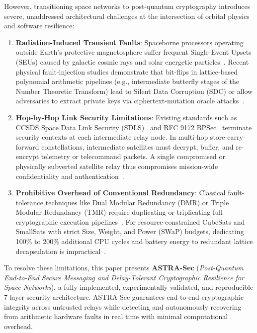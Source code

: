 \documentclass[conference,10pt]{IEEEtran}
\begin{document}
However, transitioning space networks to post-quantum cryptography introduces severe, unaddressed architectural challenges at the intersection of orbital physics and software resilience:
\begin{enumerate}
    \item \textbf{Radiation-Induced Transient Faults}: Spaceborne processors operating outside Earth's protective magnetosphere suffer frequent Single-Event Upsets (SEUs) caused by galactic cosmic rays and solar energetic particles~\cite{Dodd2003SEU,ECSS_Q_ST_60_15C}. Recent physical fault-injection studies demonstrate that bit-flips in lattice-based polynomial arithmetic pipelines (e.g., intermediate butterfly stages of the Number Theoretic Transform) lead to Silent Data Corruption (SDC) or allow adversaries to extract private keys via ciphertext-mutation oracle attacks~\cite{Ravi2023Twiddle,Delvaux2022Roulette,Hermelink2021Kyber}.
    \item \textbf{Hop-by-Hop Link Security Limitations}: Existing standards such as CCSDS Space Data Link Security (SDLS)~\cite{CCSDS_SDLS_355_0_B_1} and RFC 9172 BPSec~\cite{RFC9172_BPSec} terminate security contexts at each intermediate relay node. In multi-hop store-carry-forward constellations, intermediate satellites must decrypt, buffer, and re-encrypt telemetry or telecommand packets. A single compromised or physically subverted satellite relay thus compromises mission-wide confidentiality and authentication~\cite{Elewaily2024Relay,Kim2026SpacePQC}.
    \item \textbf{Prohibitive Overhead of Conventional Redundancy}: Classical fault-tolerance techniques like Dual Modular Redundancy (DMR) or Triple Modular Redundancy (TMR) require duplicating or triplicating full cryptographic execution pipelines~\cite{Reis2005SWIFT}. For resource-constrained CubeSats and SmallSats with strict Size, Weight, and Power (SWaP) budgets, dedicating 100\% to 200\% additional CPU cycles and battery energy to redundant lattice decapsulation is impractical~\cite{Sarker2023HWSW}.
\end{enumerate}

To resolve these limitations, this paper presents \textbf{ASTRA-Sec} (\textit{Post-Quantum End-to-End Secure Messaging and Delay-Tolerant Cryptographic Resilience for Space Networks}), a fully implemented, experimentally validated, and reproducible 7-layer security architecture. ASTRA-Sec guarantees end-to-end cryptographic integrity across untrusted relays while detecting and autonomously recovering from arithmetic hardware faults in real time with minimal computational overhead.
\end{document}
